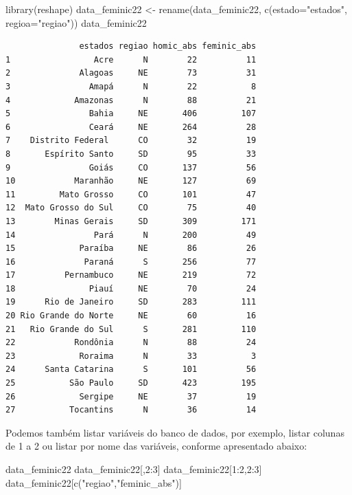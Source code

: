 \documentclass[
  letterpaper,
  DIV=11,
  numbers=noendperiod]{scrreprt}
\newenvironment{Shaded}{\begin{snugshade}}{\end{snugshade}}
\newcommand{\AttributeTok}[1]{\textcolor[rgb]{0.40,0.45,0.13}{#1}}
\newcommand{\DecValTok}[1]{\textcolor[rgb]{0.68,0.00,0.00}{#1}}
\newcommand{\FunctionTok}[1]{\textcolor[rgb]{0.28,0.35,0.67}{#1}}
\newcommand{\NormalTok}[1]{\textcolor[rgb]{0.00,0.23,0.31}{#1}}
\newcommand{\OtherTok}[1]{\textcolor[rgb]{0.00,0.23,0.31}{#1}}
\newcommand{\SpecialCharTok}[1]{\textcolor[rgb]{0.37,0.37,0.37}{#1}}
\newcommand{\StringTok}[1]{\textcolor[rgb]{0.13,0.47,0.30}{#1}}
\begin{document}
\begin{Shaded}
\begin{Highlighting}[]
\FunctionTok{library}\NormalTok{(reshape)}
\NormalTok{data\_feminic22 }\OtherTok{\textless{}{-}} \FunctionTok{rename}\NormalTok{(data\_feminic22, }\FunctionTok{c}\NormalTok{(}\AttributeTok{estado=}\StringTok{"estados"}\NormalTok{, }\AttributeTok{regioa=}\StringTok{"regiao"}\NormalTok{))}
\NormalTok{data\_feminic22}
\end{Highlighting}
\end{Shaded}

\begin{verbatim}
               estados regiao homic_abs feminic_abs
1                 Acre      N        22          11
2              Alagoas     NE        73          31
3                Amapá      N        22           8
4             Amazonas      N        88          21
5                Bahia     NE       406         107
6                Ceará     NE       264          28
7    Distrito Federal      CO        32          19
8       Espírito Santo     SD        95          33
9                Goiás     CO       137          56
10            Maranhão     NE       127          69
11         Mato Grosso     CO       101          47
12  Mato Grosso do Sul     CO        75          40
13        Minas Gerais     SD       309         171
14                Pará      N       200          49
15             Paraíba     NE        86          26
16              Paraná      S       256          77
17          Pernambuco     NE       219          72
18               Piauí     NE        70          24
19      Rio de Janeiro     SD       283         111
20 Rio Grande do Norte     NE        60          16
21   Rio Grande do Sul      S       281         110
22            Rondônia      N        88          24
23             Roraima      N        33           3
24      Santa Catarina      S       101          56
25           São Paulo     SD       423         195
26             Sergipe     NE        37          19
27           Tocantins      N        36          14
\end{verbatim}

Podemos também listar variáveis do banco de dados, por exemplo, listar
colunas de 1 a 2 ou listar por nome das variáveis, conforme apresentado
abaixo:

\begin{Shaded}
\begin{Highlighting}[]
\NormalTok{data\_feminic22}
\NormalTok{data\_feminic22[,}\DecValTok{2}\SpecialCharTok{:}\DecValTok{3}\NormalTok{]}
\NormalTok{data\_feminic22[}\DecValTok{1}\SpecialCharTok{:}\DecValTok{2}\NormalTok{,}\DecValTok{2}\SpecialCharTok{:}\DecValTok{3}\NormalTok{]}
\NormalTok{data\_feminic22[}\FunctionTok{c}\NormalTok{(}\StringTok{"regiao"}\NormalTok{,}\StringTok{"feminic\_abs"}\NormalTok{)]}
\end{Highlighting}
\end{Shaded}
\end{document}
